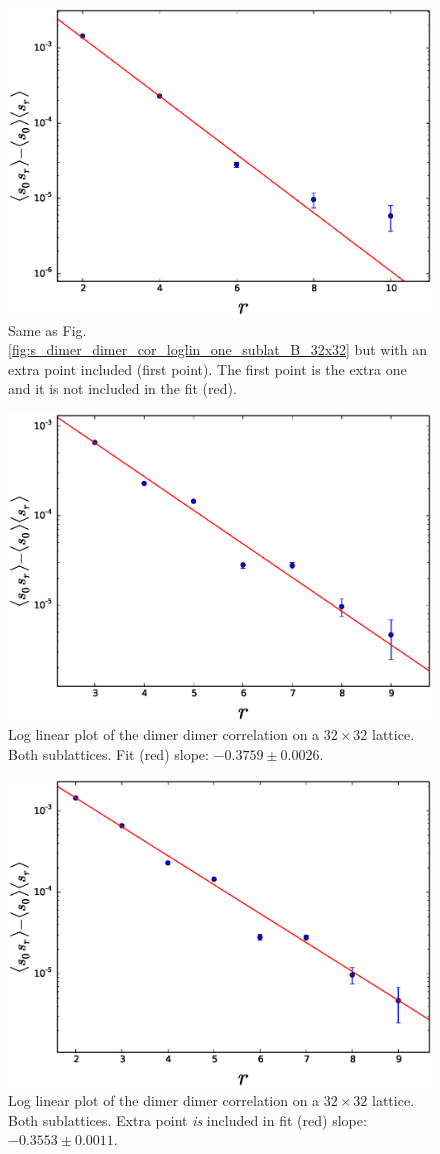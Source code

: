 \documentclass[aps,floatfix,11pt]{revtex4-1}
\begin{document}
\begin{figure}[h]
    \centering
    \includegraphics[width=8.5 cm]{s_dimer_dimer_cor_loglin_one_sublat_B_32x32_extra_pnt}
    \caption{Same as Fig. \ref{fig:s_dimer_dimer_cor_loglin_one_sublat_B_32x32} but with an extra
        point included (first point). The first point is the extra one and 
        it is not included in the fit (red).
    \label{fig:s_dimer_dimer_cor_loglin_one_sublat_B_32x32_extra_pnt}}
\end{figure}

\begin{figure}[h]
    \centering
    \includegraphics[width=8.5 cm]{s_dimer_dimer_cor_loglin_both_sublat_32x32}
    \caption{Log linear plot of the dimer dimer correlation on a $32\times32$ lattice. 
        Both sublattices. Fit (red) slope: $ -0.3759 \pm 0.0026$.
    \label{fig:s_dimer_dimer_log}}
\end{figure}

\begin{figure}[h]
    \centering
    \includegraphics[width=8.5 cm]{s_dimer_dimer_cor_loglin_both_sublat_32x32_extra_pnt}
    \caption{Log linear plot of the dimer dimer correlation on a $32\times32$ lattice. 
        Both sublattices. Extra point \textit{is} included in 
        fit (red) slope: $ -0.3553 \pm 0.0011$.
    \label{fig:s_dimer_dimer_cor_loglin_both_sublat_32x32_extra_pnt}}
\end{figure}
\end{document}
